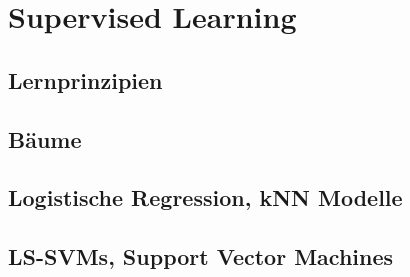 \section{Supervised Learning}

\subsection{Lernprinzipien}

\subsection{Bäume}

\subsection{Logistische Regression, kNN Modelle}

\subsection{LS-SVMs, Support Vector Machines}